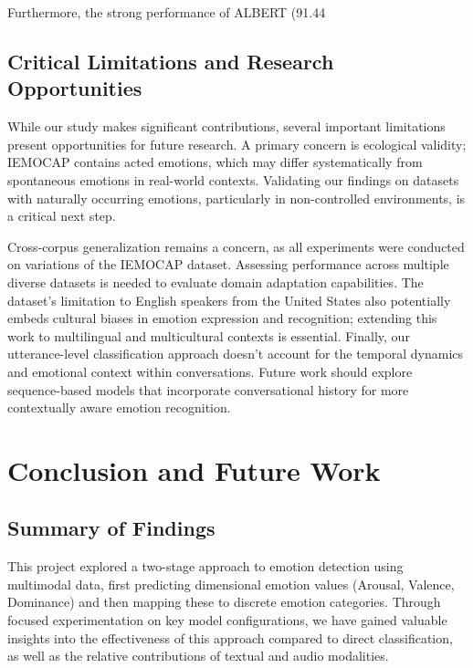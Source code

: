 \documentclass[12pt]{article}
\begin{document}
Furthermore, the strong performance of ALBERT (91.44%

\subsection{Critical Limitations and Research Opportunities}
While our study makes significant contributions, several important limitations present opportunities for future research. A primary concern is ecological validity; IEMOCAP contains acted emotions, which may differ systematically from spontaneous emotions in real-world contexts. Validating our findings on datasets with naturally occurring emotions, particularly in non-controlled environments, is a critical next step.

Cross-corpus generalization remains a concern, as all experiments were conducted on variations of the IEMOCAP dataset. Assessing performance across multiple diverse datasets is needed to evaluate domain adaptation capabilities. The dataset's limitation to English speakers from the United States also potentially embeds cultural biases in emotion expression and recognition; extending this work to multilingual and multicultural contexts is essential. Finally, our utterance-level classification approach doesn't account for the temporal dynamics and emotional context within conversations. Future work should explore sequence-based models that incorporate conversational history for more contextually aware emotion recognition.

\section{Conclusion and Future Work}
\label{sec:conclusion}

\subsection{Summary of Findings}

This project explored a two-stage approach to emotion detection using multimodal data, first predicting dimensional emotion values (Arousal, Valence, Dominance) and then mapping these to discrete emotion categories. Through focused experimentation on key model configurations, we have gained valuable insights into the effectiveness of this approach compared to direct classification, as well as the relative contributions of textual and audio modalities.
\end{document}
